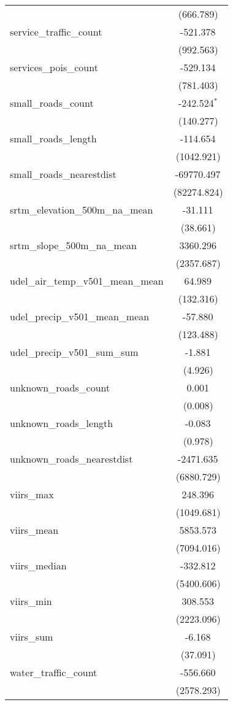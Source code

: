 \begin{table}[!htbp]
\begin{tabular}{@{\extracolsep{5pt}}lc}
  & (666.789) \\
 service_traffic_count & -521.378$^{}$ \\
  & (992.563) \\
 services_pois_count & -529.134$^{}$ \\
  & (781.403) \\
 small_roads_count & -242.524$^{*}$ \\
  & (140.277) \\
 small_roads_length & -114.654$^{}$ \\
  & (1042.921) \\
 small_roads_nearestdist & -69770.497$^{}$ \\
  & (82274.824) \\
 srtm_elevation_500m_na_mean & -31.111$^{}$ \\
  & (38.661) \\
 srtm_slope_500m_na_mean & 3360.296$^{}$ \\
  & (2357.687) \\
 udel_air_temp_v501_mean_mean & 64.989$^{}$ \\
  & (132.316) \\
 udel_precip_v501_mean_mean & -57.880$^{}$ \\
  & (123.488) \\
 udel_precip_v501_sum_sum & -1.881$^{}$ \\
  & (4.926) \\
 unknown_roads_count & 0.001$^{}$ \\
  & (0.008) \\
 unknown_roads_length & -0.083$^{}$ \\
  & (0.978) \\
 unknown_roads_nearestdist & -2471.635$^{}$ \\
  & (6880.729) \\
 viirs_max & 248.396$^{}$ \\
  & (1049.681) \\
 viirs_mean & 5853.573$^{}$ \\
  & (7094.016) \\
 viirs_median & -332.812$^{}$ \\
  & (5400.606) \\
 viirs_min & 308.553$^{}$ \\
  & (2223.096) \\
 viirs_sum & -6.168$^{}$ \\
  & (37.091) \\
 water_traffic_count & -556.660$^{}$ \\
  & (2578.293) \\

\end{tabular}
\end{table}
